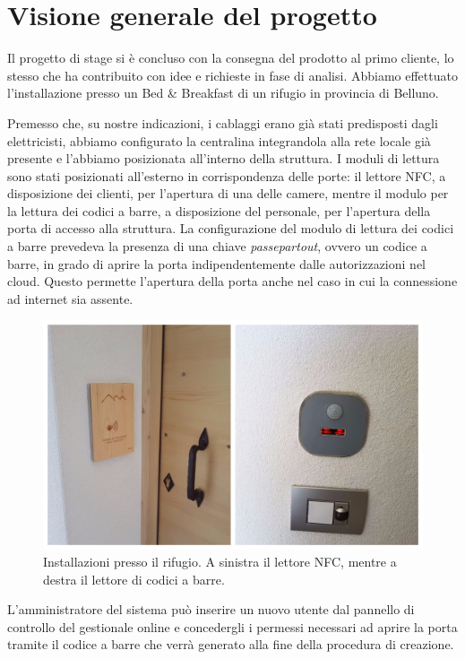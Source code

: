 \section{Visione generale del progetto}
Il progetto di stage si è concluso con la consegna del prodotto al primo cliente, lo stesso che ha contribuito con idee e richieste in fase di analisi. Abbiamo effettuato l'installazione presso un Bed \& Breakfast di un rifugio in provincia di Belluno. 

Premesso che, su nostre indicazioni, i cablaggi erano già stati predisposti dagli elettricisti, abbiamo configurato la centralina integrandola alla rete locale già presente e l'abbiamo posizionata all'interno della struttura. I moduli di lettura sono stati posizionati all'esterno in corrispondenza delle porte: il lettore NFC, a disposizione dei clienti, per l'apertura di una delle camere, mentre il modulo per la lettura dei codici a barre, a disposizione del personale, per l'apertura della porta di accesso alla struttura. 
La configurazione del modulo di lettura dei codici a barre prevedeva la presenza di una chiave \textit{passepartout}, ovvero un codice a barre, in grado di aprire la porta indipendentemente dalle autorizzazioni nel cloud. Questo permette l'apertura della porta anche nel caso in cui la connessione ad internet sia assente.

\begin{figure}[H]
	\begin{center}
	\includegraphics[scale=0.4]{immagini/rifugio.jpg}
	\caption{Installazioni presso il rifugio. A sinistra il lettore NFC, mentre a destra il lettore di codici a barre.}
	\end{center}
\end{figure}

L'amministratore del sistema può inserire un nuovo utente dal pannello di controllo del gestionale online e concedergli i permessi necessari ad aprire la porta tramite il codice a barre che verrà generato alla fine della procedura di creazione.

